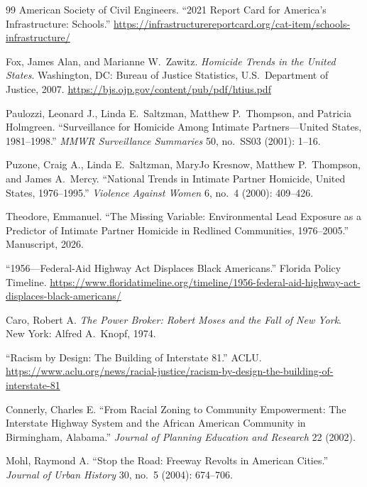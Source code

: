 \documentclass[12pt,openany]{book}
\begin{document}
\begin{thebibliography}{99}
American Society of Civil Engineers. ``2021 Report Card for America's Infrastructure: Schools.'' \url{https://infrastructurereportcard.org/cat-item/schools-infrastructure/}


Fox, James Alan, and Marianne W.\ Zawitz. \textit{Homicide Trends in the United States}. Washington, DC: Bureau of Justice Statistics, U.S.\ Department of Justice, 2007. \url{https://bjs.ojp.gov/content/pub/pdf/htius.pdf}

Paulozzi, Leonard J., Linda E.\ Saltzman, Matthew P.\ Thompson, and Patricia Holmgreen. ``Surveillance for Homicide Among Intimate Partners---United States, 1981--1998.'' \textit{MMWR Surveillance Summaries} 50, no.\ SS03 (2001): 1--16.

Puzone, Craig A., Linda E.\ Saltzman, MaryJo Kresnow, Matthew P.\ Thompson, and James A.\ Mercy. ``National Trends in Intimate Partner Homicide, United States, 1976--1995.'' \textit{Violence Against Women} 6, no.\ 4 (2000): 409--426.

Theodore, Emmanuel. ``The Missing Variable: Environmental Lead Exposure as a Predictor of Intimate Partner Homicide in Redlined Communities, 1976--2005.'' Manuscript, 2026.


``1956---Federal-Aid Highway Act Displaces Black Americans.'' Florida Policy Timeline. \url{https://www.floridatimeline.org/timeline/1956-federal-aid-highway-act-displaces-black-americans/}

Caro, Robert A. \textit{The Power Broker: Robert Moses and the Fall of New York}. New York: Alfred A.\ Knopf, 1974.

``Racism by Design: The Building of Interstate 81.'' ACLU. \url{https://www.aclu.org/news/racial-justice/racism-by-design-the-building-of-interstate-81}

Connerly, Charles E. ``From Racial Zoning to Community Empowerment: The Interstate Highway System and the African American Community in Birmingham, Alabama.'' \textit{Journal of Planning Education and Research} 22 (2002).

Mohl, Raymond A. ``Stop the Road: Freeway Revolts in American Cities.'' \textit{Journal of Urban History} 30, no.\ 5 (2004): 674--706.


\end{thebibliography}
\end{document}
